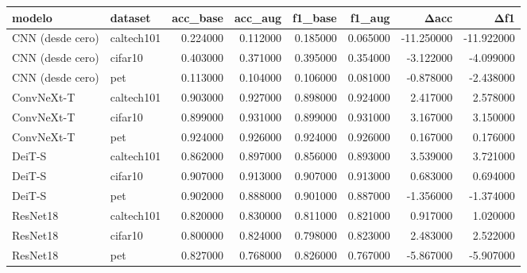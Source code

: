 \begin{tabular}{llrrrrrr}
\toprule
modelo & dataset & acc_base & acc_aug & f1_base & f1_aug & Δacc & Δf1 \\
\midrule
CNN (desde cero) & caltech101 & 0.224000 & 0.112000 & 0.185000 & 0.065000 & -11.250000 & -11.922000 \\
CNN (desde cero) & cifar10 & 0.403000 & 0.371000 & 0.395000 & 0.354000 & -3.122000 & -4.099000 \\
CNN (desde cero) & pet & 0.113000 & 0.104000 & 0.106000 & 0.081000 & -0.878000 & -2.438000 \\
ConvNeXt-T & caltech101 & 0.903000 & 0.927000 & 0.898000 & 0.924000 & 2.417000 & 2.578000 \\
ConvNeXt-T & cifar10 & 0.899000 & 0.931000 & 0.899000 & 0.931000 & 3.167000 & 3.150000 \\
ConvNeXt-T & pet & 0.924000 & 0.926000 & 0.924000 & 0.926000 & 0.167000 & 0.176000 \\
DeiT-S & caltech101 & 0.862000 & 0.897000 & 0.856000 & 0.893000 & 3.539000 & 3.721000 \\
DeiT-S & cifar10 & 0.907000 & 0.913000 & 0.907000 & 0.913000 & 0.683000 & 0.694000 \\
DeiT-S & pet & 0.902000 & 0.888000 & 0.901000 & 0.887000 & -1.356000 & -1.374000 \\
ResNet18 & caltech101 & 0.820000 & 0.830000 & 0.811000 & 0.821000 & 0.917000 & 1.020000 \\
ResNet18 & cifar10 & 0.800000 & 0.824000 & 0.798000 & 0.823000 & 2.483000 & 2.522000 \\
ResNet18 & pet & 0.827000 & 0.768000 & 0.826000 & 0.767000 & -5.867000 & -5.907000 \\
\bottomrule
\end{tabular}
